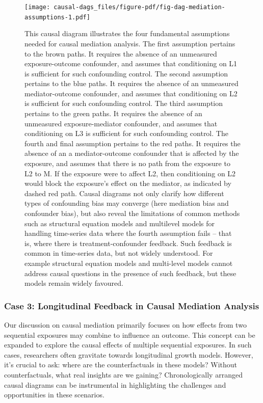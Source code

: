 \documentclass[
  singlecolumn,
  9pt]{article}
\begin{document}
\begin{figure}

{\centering \texttt{[image: causal-dags\_files/figure-pdf/fig-dag-mediation-assumptions-1.pdf]}

}

\caption{\label{fig-dag-mediation-assumptions}This causal diagram
illustrates the four fundamental assumptions needed for causal mediation
analysis. The first assumption pertains to the brown paths. It requires
the absence of an unmeasured exposure-outcome confounder, and assumes
that conditioning on L1 is sufficient for such confounding control. The
second assumption pertains to the blue paths. It requires the absence of
an unmeasured mediator-outcome confounder, and assumes that conditioning
on L2 is sufficient for such confounding control. The third assumption
pertains to the green paths. It requires the absence of an unmeasured
exposure-mediator confounder, and assumes that conditioning on L3 is
sufficient for such confounding control. The fourth and final assumption
pertains to the red paths. It requires the absence of an a
mediator-outcome confounder that is affected by the exposure, and
assumes that there is no path from the exposure to L2 to M. If the
exposure were to affect L2, then conditioning on L2 would block the
exposure's effect on the mediator, as indicated by dashed red path.
Causal diagrams not only clarify how different types of confounding bias
may converge (here mediation bias and confounder bias), but also reveal
the limitations of common methods such as structural equation models and
multilevel models for handling time-series data where the fourth
assumption fails -- that is, where there is treatment-confounder
feedback. Such feedback is common in time-series data, but not widely
understood. For example structural equation models and multi-level
models cannot address causal questions in the presence of such feedback,
but these models remain widely favoured.}

\end{figure}

\subsubsection{Case 3: Longitudinal Feedback in Causal Mediation
Analysis}\label{case-3-longitudinal-feedback-in-causal-mediation-analysis}

Our discussion on causal mediation primarily focuses on how effects from
two sequential exposures may combine to influence an outcome. This
concept can be expanded to explore the causal effects of multiple
sequential exposures. In such cases, researchers often gravitate towards
longitudinal growth models. However, it's crucial to ask: where are the
counterfactuals in these models? Without counterfactuals, what real
insights are we gaining? Chronologically arranged causal diagrams can be
instrumental in highlighting the challenges and opportunities in these
scenarios.
\end{document}
